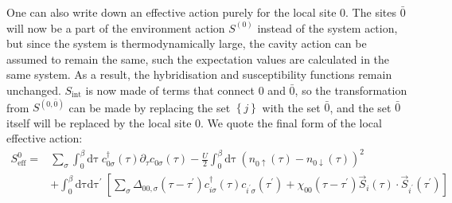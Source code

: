 One can also write down an effective action purely for the local site \(0\). The sites \(\bar 0\) will now be a part of the environment action \(S^{(0)}\) instead of the system action, but since the system is thermodynamically large, the cavity action can be assumed to remain the same, such the expectation values are calculated in the same system. As a result, the hybridisation and susceptibility functions remain unchanged. \(S_\text{int}\) is now made of terms that connect \(0\) and \(\bar 0\), so the transformation from \(S^{(0,\bar 0)}\) can be made by replacing the set \(\left\{ j \right\} \) with the set \(\bar 0\), and the set \(\bar 0\) itself will be replaced by the local site \(0\). We quote the final form of the local effective action:
\begin{equation}\begin{aligned}\label{hubAction}
	S^{0}_\text{eff} =& \sum_\sigma \int_0^\beta\mathrm{d\tau}~c^\dagger_{0\sigma}(\tau)\partial_\tau c_{0\sigma}(\tau) - \frac{U}{2}\int_0^\beta\mathrm{d\tau}~\left(n_{0\uparrow}(\tau) - n_{0\downarrow}(\tau)\right)^2 \\
			  &+ \int_0^\beta\mathrm{d\tau}\mathrm{d\tau^\prime}~\left[\sum_{\sigma}\Delta_{00,\sigma}(\tau - \tau^\prime)c^\dagger_{i\sigma}(\tau)c_{i^\prime\sigma}(\tau^\prime) + \chi_{00}(\tau - \tau^\prime)\vec{S}_{i}(\tau)\cdot\vec{S}_{i^\prime}(\tau^\prime)\right]
\end{aligned}\end{equation}

